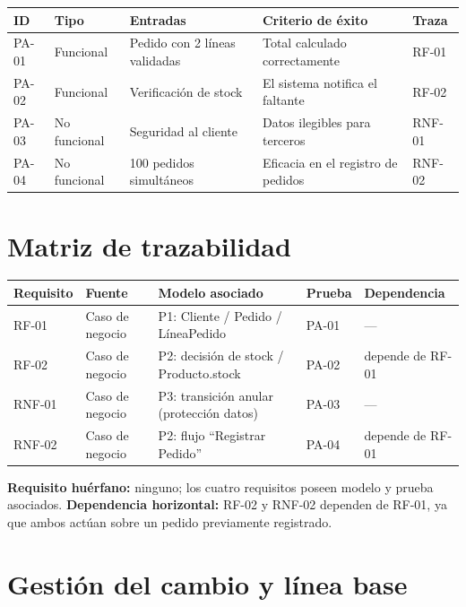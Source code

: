 \documentclass[11pt]{article}
\begin{document}
\begin{center}
\small
\begin{tabular}{@{}lllll@{}}
\toprule
\textbf{ID} & \textbf{Tipo} & \textbf{Entradas} & \textbf{Criterio de éxito} & \textbf{Traza} \\
\midrule
PA-01 & Funcional     & Pedido con 2 líneas validadas & Total calculado correctamente & RF-01 \\
PA-02 & Funcional     & Verificación de stock          & El sistema notifica el faltante & RF-02 \\
PA-03 & No funcional  & Seguridad al cliente            & Datos ilegibles para terceros & RNF-01 \\
PA-04 & No funcional  & 100 pedidos simultáneos         & Eficacia en el registro de pedidos & RNF-02 \\
\bottomrule
\end{tabular}
\end{center}

\section{Matriz de trazabilidad}

\begin{center}
\small
\begin{tabular}{@{}lllll@{}}
\toprule
\textbf{Requisito} & \textbf{Fuente} & \textbf{Modelo asociado} & \textbf{Prueba} & \textbf{Dependencia} \\
\midrule
RF-01  & Caso de negocio & P1: Cliente / Pedido / LíneaPedido        & PA-01 & --- \\
RF-02  & Caso de negocio & P2: decisión de stock / Producto.stock    & PA-02 & depende de RF-01 \\
RNF-01 & Caso de negocio & P3: transición anular (protección datos)  & PA-03 & --- \\
RNF-02 & Caso de negocio & P2: flujo ``Registrar Pedido''            & PA-04 & depende de RF-01 \\
\bottomrule
\end{tabular}
\end{center}

\textbf{Requisito huérfano:} ninguno; los cuatro requisitos poseen modelo y prueba asociados.
\textbf{Dependencia horizontal:} RF-02 y RNF-02 dependen de RF-01, ya que ambos actúan sobre un
pedido previamente registrado.

\section{Gestión del cambio y línea base}
\end{document}
